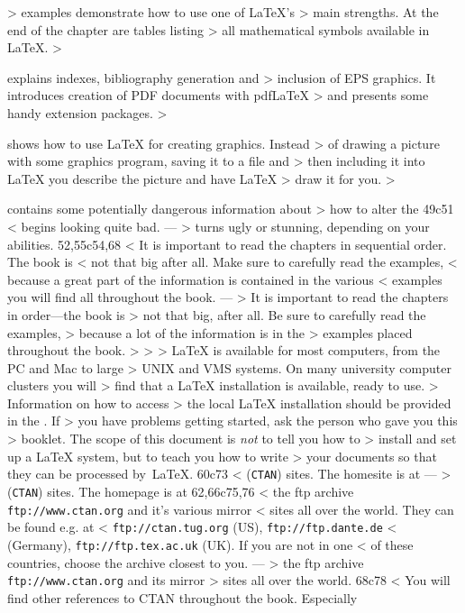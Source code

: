 >   examples demonstrate how to use one of \LaTeX{}'s
>   main strengths. At the end of the chapter are tables listing
>   all mathematical symbols available in \LaTeX{}.
> \item[Chapter 4] explains indexes,  bibliography generation and
>   inclusion of EPS graphics. It introduces creation of PDF documents with pdf\LaTeX{}
>   and presents some handy extension packages.
> \item[Chapter 5] shows how to use \LaTeX{} for creating graphics. Instead
>   of drawing a picture with some graphics program, saving it to a file and
>   then including it into \LaTeX{} you describe the picture and have \LaTeX{}
>   draw it for you.
> \item[Chapter 6] contains some potentially dangerous information about
>   how to alter the
49c51
<   begins looking quite bad.
---
>   turns ugly or stunning, depending on your abilities.
52,55c54,68
< It is important to read the chapters in sequential order. The book is
< not that big after all. Make sure to carefully read the examples,
< because a great part of the information is contained in the various
< examples you will find all throughout the book.
---
> \noindent It is important to read the chapters in order---the book is
> not that big, after all. Be sure to carefully read the examples,
> because a lot of the information is in the
> examples placed throughout the book.
> 
> \bigskip
> \noindent \LaTeX{} is available for most computers, from the PC and Mac to large
> UNIX and VMS systems. On many university computer clusters you will
> find that a \LaTeX{} installation is available, ready to use.
> Information on how to access
> the local \LaTeX{} installation should be provided in the \guide. If
> you have problems getting started, ask the person who gave you this
> booklet. The scope of this document is \emph{not} to tell you how to
> install and set up a \LaTeX{} system, but to teach you how to write
> your documents so that they can be processed by~\LaTeX{}.
60c73
< (\texttt{CTAN}) sites. The homesite is at
---
> (\texttt{CTAN}) sites. The homepage is at
62,66c75,76
< the ftp archive \texttt{ftp://www.ctan.org} and it's various mirror
< sites all over the world.  They can be found e.g.{} at
< \texttt{ftp://ctan.tug.org} (US), \texttt{ftp://ftp.dante.de}
< (Germany), \texttt{ftp://ftp.tex.ac.uk} (UK).  If you are not in one
< of these countries, choose the archive closest to you.
---
> the ftp archive \texttt{ftp://www.ctan.org} and its mirror
> sites all over the world.
68c78
< You will find other references to CTAN throughout the book. Especially

